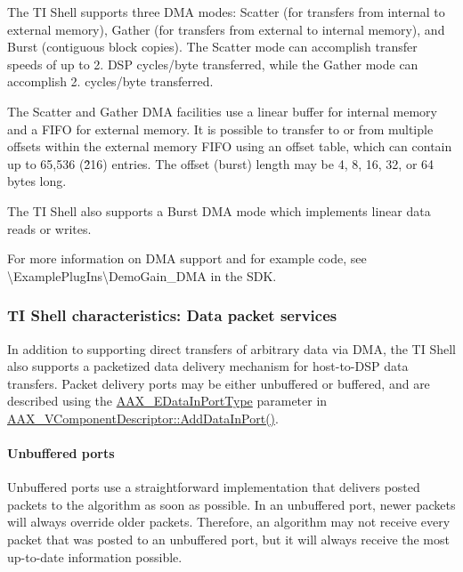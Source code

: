 The TI Shell supports three D\+MA modes\+: Scatter (for transfers from internal to external memory), Gather (for transfers from external to internal memory), and Burst (contiguous block copies). The Scatter mode can accomplish transfer speeds of up to 2. D\+SP cycles/byte transferred, while the Gather mode can accomplish 2. cycles/byte transferred.

The Scatter and Gather D\+MA facilities use a linear buffer for internal memory and a F\+I\+FO for external memory. It is possible to transfer to or from multiple offsets within the external memory F\+I\+FO using an offset table, which can contain up to 65,536 (2̂16) entries. The offset (burst) length may be 4, 8, 16, 32, or 64 bytes long.

The TI Shell also supports a Burst D\+MA mode which implements linear data reads or writes.

For more information on D\+MA support and for example code, see {\ttfamily \textbackslash{}Example\+Plug\+Ins\textbackslash{}Demo\+Gain\+\_\+\+D\+MA} in the S\+DK.

\hypertarget{a00832_subsection__ti_shell_characteristics_data_packet_services}{}\subsubsection{T\+I Shell characteristics\+: Data packet services}\label{a00832_subsection__ti_shell_characteristics_data_packet_services}
 In addition to supporting direct transfers of arbitrary data via D\+MA, the TI Shell also supports a packetized data delivery mechanism for host-\/to-\/\+D\+SP data transfers. Packet delivery ports may be either unbuffered or buffered, and are described using the \mbox{\hyperlink{a00491_ab5677b173ad8647c24d34d28272d11fc}{A\+A\+X\+\_\+\+E\+Data\+In\+Port\+Type}} parameter in \mbox{\hyperlink{a01901_a1b2c3ae4de896e0f47a771ad8b1b5d08}{A\+A\+X\+\_\+\+V\+Component\+Descriptor\+::\+Add\+Data\+In\+Port()}}.

\hypertarget{a00832_subsubsection__unbuffered_ports_}{}\paragraph{Unbuffered ports}\label{a00832_subsubsection__unbuffered_ports_}
 Unbuffered ports use a straightforward implementation that delivers posted packets to the algorithm as soon as possible. In an unbuffered port, newer packets will always override older packets. Therefore, an algorithm may not receive every packet that was posted to an unbuffered port, but it will always receive the most up-\/to-\/date information possible.


